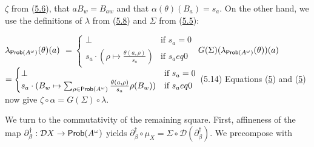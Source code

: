 \hypertarget{html:S5.SS0.SSS0.Px2.SPx1.p4.m6}{}\({\zeta}\) from (\hyperlink{html:S5.E6}{5.6}), that %
\hypertarget{html:S5.SS0.SSS0.Px2.SPx1.p4.m7}{}\({aB_{w}=B_{aw}}\) and that %
\hypertarget{html:S5.SS0.SSS0.Px2.SPx1.p4.m8}{}\({\alpha(\theta)(B_{a})=s_{a}}\). On the other hand, we use the definitions of %
\hypertarget{html:S5.SS0.SSS0.Px2.SPx1.p4.m9}{}\({\lambda}\) from (\hyperlink{html:S5.E8}{5.8}) and %
\hypertarget{html:S5.SS0.SSS0.Px2.SPx1.p4.m10}{}\({\Sigma}\) from (\hyperlink{html:S5.E5}{5.5}):
\par\medskip
\hypertarget{html:S8.EGx9}{} %
\hypertarget{html:S5.Ex8}{}  %
\hypertarget{html:S5.Ex8.m1}{}\({\displaystyle\lambda_{\text{\sf Prob}(A^{\omega})}(\theta)(a)}\) %
\hypertarget{html:S5.Ex8.m2}{}\({\displaystyle=\begin{cases}\bot&\mbox{if $s_{a}=0$}\\
s_{a}\cdot(\rho\mapsto\frac{\theta(a,\rho)}{s_{a}})&\mbox{if $s_{a}
eq 0$}\end{cases}}\)   %
\hypertarget{html:S5.E14}{}  %
\hypertarget{html:S5.E14.m1}{}\({\displaystyle G(\Sigma)(\lambda_{\text{\sf Prob}(A^{\omega})}(\theta))(a)}\) %
\hypertarget{html:S5.E14.m2}{}\({\displaystyle=\begin{cases}\bot&\mbox{if $s_{a}=0$}\\
s_{a}\cdot(B_{w}\mapsto\sum_{\rho\in\text{\sf Prob}(A^{\omega})}\frac{\theta(a,\rho)}{s_{a}}\rho(B_{w}))&\mbox{if $s_{a}
eq 0$}\end{cases}}\)  (5.14)   Equations (\hyperlink{html:S5.Ex7}{5}) and (\hyperlink{html:S5.Ex8}{5}) now give %
\hypertarget{html:S5.SS0.SSS0.Px2.SPx1.p4.m11}{}\({\zeta\circ\alpha=G(\Sigma)\circ\lambda}\).
\par\medskip
\hypertarget{html:S5.SS0.SSS0.Px2.SPx1.p5}{} We turn to the commutativity of the remaining square. First, affineness of the map %
\hypertarget{html:S5.SS0.SSS0.Px2.SPx1.p5.m1}{}\({\partial_{\beta}^{\dagger}:{\mathcal{D}}X\to\text{\sf Prob}(A^{\omega})}\) yields %
\hypertarget{html:S5.SS0.SSS0.Px2.SPx1.p5.m2}{}\({\partial_{\beta}^{\dagger}\circ\mu_{X}=\Sigma\circ{\mathcal{D}}(\partial_{\beta}^{\dagger})}\). We precompose with %
